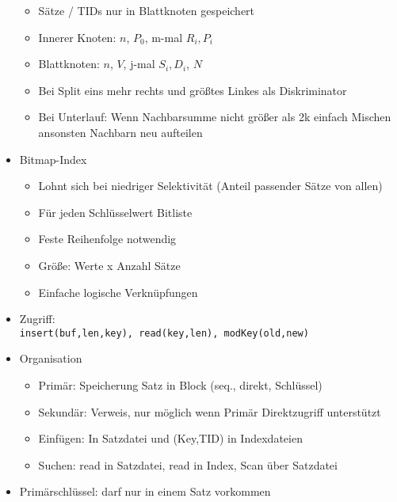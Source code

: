 \documentclass[11pt, paper=a4, twocolumn]{scrartcl}
\begin{document}
\begin{itemize}
\begin{itemize}
					\item Sätze / TIDs nur in Blattknoten gespeichert
					\item Innerer Knoten: $n$, $P_0$, m-mal $R_i,P_i$
					\item Blattknoten: $n$, $V$, j-mal $S_i,D_i$, $N$
					\item Bei Split eins mehr rechts und größtes 
						Linkes als Diskriminator
					\item Bei Unterlauf: Wenn Nachbarsumme nicht 
						größer als 2k einfach Mischen ansonsten 
						Nachbarn neu aufteilen
				\end{itemize}
			\item Bitmap-Index
				\begin{itemize}
					\item Lohnt sich bei niedriger Selektivität 
						(Anteil passender Sätze von allen)
					\item Für jeden Schlüsselwert Bitliste
					\item Feste Reihenfolge notwendig
					\item Größe: Werte x Anzahl Sätze
					\item Einfache logische Verknüpfungen
				\end{itemize}
			\item Zugriff:\\ \texttt{insert(buf,len,key), read(key,len), 
				modKey(old,new)}
			\item Organisation
				\begin{itemize}
					\item Primär: Speicherung Satz in Block (seq., 
						direkt, Schlüssel)
					\item Sekundär: Verweis, nur möglich wenn Primär 
						Direktzugriff unterstützt
					\item Einfügen: In Satzdatei und (Key,TID) in 
						Indexdateien
					\item Suchen: read in Satzdatei, read in Index, 
						Scan über Satzdatei
				\end{itemize}
			\item Primärschlüssel: darf nur in einem Satz vorkommen
		\end{itemize}
\end{document}
